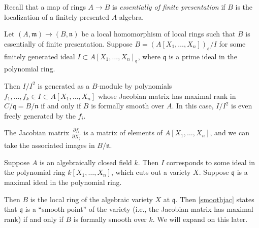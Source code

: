 Recall that a map of rings $A \to B$ is \emph{essentially of finite
presentation} if $B$ is the localization of a finitely presented $A$-algebra.


\begin{proposition} \label{smoothjac}
Let $(A, \mathfrak{m}) \to (B, \mathfrak{n})$ be a local homomorphism of local
rings such that $B$ is essentially of finite presentation.
Suppose $B = (A[X_1, \dots, X_n])_{\mathfrak{q}}/I$ for some finitely generated
ideal $I \subset A[X_1, \dots, X_n]_{\mathfrak{q}}$, where $\mathfrak{q}$ is a
prime ideal in the polynomial ring.

Then $I/I^2$ is generated as a $B$-module by polynomials
$f_1, \dots, f_k \in I \subset A[X_1, \dots, X_n]$ whose Jacobian matrix has maximal rank
in $C/\mathfrak{q} = B/\mathfrak{n}$ if and only if $B$ is formally smooth over $A$.
In this case, $I/I^2$ is even freely generated by the $f_i$.
\end{proposition} 

The Jacobian matrix $\frac{\partial f_i}{\partial X_j}$ is a matrix of
elements of $A[X_1, \dots, X_n]$, and we can take the associated images in
$B/\mathfrak{n}$. 

\begin{example} 
Suppose $A$ is an algebraically closed field $k$. 
Then $I$ corresponds to some ideal in the polynomial ring $k[X_1, \dots,
X_n]$, which cuts out a variety $X$.
Suppose $\mathfrak{q}$ is a maximal ideal in the polynomial ring.

Then $B$ is the  local 
ring of the  algebraic variety $X$ at $\mathfrak{q}$. 
Then \cref{smoothjac} states that $\mathfrak{q}$ is  a ``smooth point''
of the variety (i.e., the Jacobian matrix has maximal rank) if and only if
$B$ is formally smooth over $k$. 
We will expand on this later. 
\end{example} 


